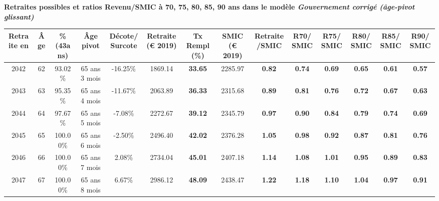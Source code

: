  \vspace{0.1cm} 
{\bf \noindent Retraites possibles et ratios Revenu/SMIC à 70, 75, 80, 85, 90 ans dans le modèle \emph{Gouvernement corrigé (âge-pivot glissant)}}  
 
\begin{adjustbox}{max width=\textwidth} 
\begin{tabular}[htb]{|c|c||c|c|c||c|c||c|c||c|c|c|c|c|} 
\hline 
 Retraite en &  Âge &  \%(43ans) &  Âge pivot &  Décote/Surcote &  Retraite (\euro{} 2019) &  Tx Rempl(\%) &  SMIC (\euro{} 2019) &  Retraite/SMIC &  R70/SMIC &  R75/SMIC &  R80/SMIC &  R85/SMIC &  R90/SMIC \\ 
\hline \hline 
 2042 &  62 &  93.02\% &  65 ans 3 mois &  -16.25\% &  1869.14 &  {\bf 33.65} &  2285.97 &  {\bf {\color{red} 0.82}} &  {\bf {\color{red} 0.74}} &  {\bf {\color{red} 0.69}} &  {\bf {\color{red} 0.65}} &  {\bf {\color{red} 0.61}} &  {\bf {\color{red} 0.57}} \\ 
\hline 
 2043 &  63 &  95.35\% &  65 ans 4 mois &  -11.67\% &  2063.89 &  {\bf 36.33} &  2315.68 &  {\bf {\color{red} 0.89}} &  {\bf {\color{red} 0.81}} &  {\bf {\color{red} 0.76}} &  {\bf {\color{red} 0.72}} &  {\bf {\color{red} 0.67}} &  {\bf {\color{red} 0.63}} \\ 
\hline 
 2044 &  64 &  97.67\% &  65 ans 5 mois &  -7.08\% &  2272.67 &  {\bf 39.12} &  2345.79 &  {\bf {\color{red} 0.97}} &  {\bf {\color{red} 0.90}} &  {\bf {\color{red} 0.84}} &  {\bf {\color{red} 0.79}} &  {\bf {\color{red} 0.74}} &  {\bf {\color{red} 0.69}} \\ 
\hline 
 2045 &  65 &  100.00\% &  65 ans 6 mois &  -2.50\% &  2496.40 &  {\bf 42.02} &  2376.28 &  {\bf 1.05} &  {\bf {\color{red} 0.98}} &  {\bf {\color{red} 0.92}} &  {\bf {\color{red} 0.87}} &  {\bf {\color{red} 0.81}} &  {\bf {\color{red} 0.76}} \\ 
\hline 
 2046 &  66 &  100.00\% &  65 ans 7 mois &  2.08\% &  2734.04 &  {\bf 45.01} &  2407.18 &  {\bf 1.14} &  {\bf 1.08} &  {\bf 1.01} &  {\bf {\color{red} 0.95}} &  {\bf {\color{red} 0.89}} &  {\bf {\color{red} 0.83}} \\ 
\hline 
 2047 &  67 &  100.00\% &  65 ans 8 mois &  6.67\% &  2986.12 &  {\bf 48.09} &  2438.47 &  {\bf 1.22} &  {\bf 1.18} &  {\bf 1.10} &  {\bf 1.04} &  {\bf {\color{red} 0.97}} &  {\bf {\color{red} 0.91}} \\ 
\hline 
\hline 
\end{tabular} 
\end{adjustbox} 
 
